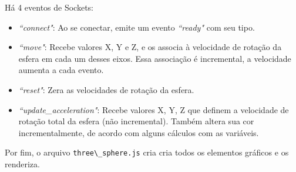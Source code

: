\documentclass[a4paper,12pt]{article}
\newcommand{\code}[1]{\lstinline[mathescape=true, columns=fixed, basicstyle={\small\ttfamily}]{#1}}
\begin{document}
Há 4 eventos de Sockets:

\begin{itemize}

  \item \emph{“connect"}: Ao se conectar, emite um evento \emph{“ready"} com seu tipo.

  \item \emph{“move"}: Recebe valores X, Y e Z, e os associa à velocidade de rotação da esfera em cada um desses eixos. Essa associação é incremental, a velocidade aumenta a cada evento.

  \item \emph{“reset"}: Zera as velocidades de rotação da esfera.

  \item \emph{“update\_acceleration"}: Recebe valores X, Y, Z que definem a velocidade de rotação total da esfera (não incremental). Também altera sua cor incrementalmente, de acordo com alguns cálculos com as variáveis.

\end{itemize}

Por fim, o arquivo \code{three\_sphere.js} cria cria todos os elementos gráficos e os renderiza.
\end{document}
